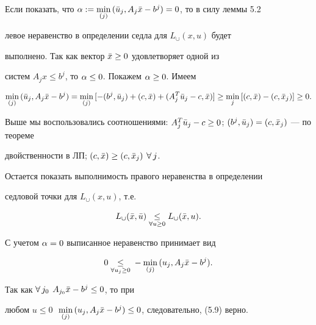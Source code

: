 \begin{pf} Если показать, что $\al:= \min\limits_{(j)}\,


(\Bar{u}_j, A_j \Bar{x} -b^j) = 0$, то в силу леммы 5.2


левое неравенство в определении седла для $L_{\cup} (x, u)$ будет


выполнено. Так как вектор $\Bar{x} \ge 0$ удовлетворяет одной из


систем $A_j x \le b^j$, то $\alpha \le 0$. Покажем $\alpha \ge 0$. Имеем


$$


\min_{(j)}\, (\Bar{u}_j, A_j \Bar{x} -b^j) =


\min_{(j)}\, [ -(b^j, \Bar{u}_j) +(c, \Bar{x}) + (A_j^T


\Bar{u}_j - c, \Bar{x}) ] \ge \min_j\, [ (c, \Bar{x}) - (c,


\Bar{x}_j) ] \ge 0.


$$


Выше мы воспользовались соотношениями: $A_j^T \Bar{u}_j - c


\ge 0$; $(b^j, \Bar{u}_j) = (c, \Bar{x}_j)$ --- по теореме


двойственности в ЛП; $(c, \Bar{x}) \ge (c, \Bar{x}_j)$ $\forall\, j$.





Остается показать выполнимость правого неравенства в определении


седловой точки для $L_{\cup} (x, u)$, т.е.


$$


L_{\cup} (\Bar{x}, \Bar{u})


\underset{\forall u\ge 0}{\le}{}


L_{\cup} (\Bar{x}, u).


$$


С учетом $\alpha = 0$ выписанное неравенство принимает вид


\begin{equation}


0 \underset{\forall u_j\ge 0}{\le}{}


-\min_{(j)}\, (u_j, A_j \Bar{x} - b^j).


\end{equation}


Так как $\forall\, j_0$ $A_{j_0} \Bar{x} -b^j \le 0$, то при


любом $u \le 0\;$ $\min\limits_{(j)}\, (u_j, A_j \Bar{x} -b^j) \le


0$, следовательно, (5.9) верно.


\end{pf}





